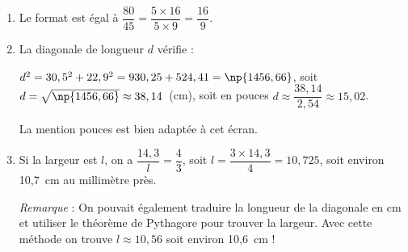 
\bigskip

%
 
\begin{enumerate}
\item %
 
Le format est égal à  $\dfrac{80}{45} = \dfrac{5\times 16}{5\times 9} = \dfrac{16}{9}$. 
\item %

La diagonale de longueur $d$ vérifie :

$d^2 = 30,5^2 + 22,9^2 = 930,25 + 524,41 = \np{1456,66}$, soit $d = \sqrt{\np{1456,66}} \approx 38,14$~(cm), soit en pouces $d \approx \dfrac{38,14}{2,54} \approx 15,02$.

La mention  pouces \fg{} est bien adaptée à  cet écran. 
\item %
Si la largeur est $l$, on a $\dfrac{14,3}{l} = \dfrac{4}{3}$, soit $l = \dfrac{3 \times 14,3}{4} = 10,725$, soit environ 10,7~cm au millimètre près.

\emph{Remarque} :  On pouvait également traduire la longueur de la diagonale en cm et utiliser le théorème de Pythagore pour trouver la largeur. Avec cette méthode on trouve $l \approx 10,56$ soit environ 10,6~cm !
\end{enumerate}
 
\bigskip
 
